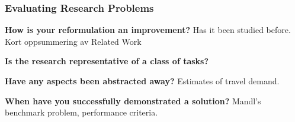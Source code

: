 \subsubsection{Evaluating Research Problems}

\textbf{How is your reformulation an improvement?}
Has it been studied before. Kort oppsummering av Related Work 

\textbf{Is the research representative of a class of tasks?}

\textbf{Have any aspects been abstracted away?}
Estimates of travel demand.

\textbf{When have you successfully demonstrated a solution?}
Mandl's benchmark problem, performance criteria.
